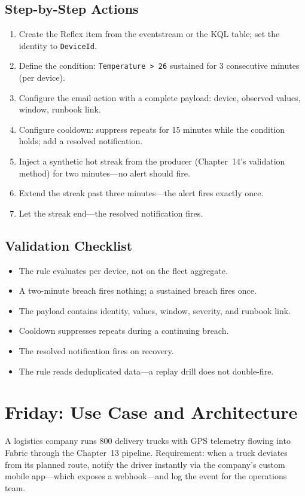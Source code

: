 \subsection{Step-by-Step Actions}
\begin{enumerate}
    \item Create the Reflex item from the eventstream or the KQL table; set the identity to \texttt{DeviceId}.
    \item Define the condition: \texttt{Temperature > 26} sustained for 3 consecutive minutes (per device).
    \item Configure the email action with a complete payload: device, observed values, window, runbook link.
    \item Configure cooldown: suppress repeats for 15 minutes while the condition holds; add a resolved notification.
    \item Inject a synthetic hot streak from the producer (Chapter~14's validation method) for two minutes---no alert should fire.
    \item Extend the streak past three minutes---the alert fires exactly once.
    \item Let the streak end---the resolved notification fires.
\end{enumerate}

\subsection{Validation Checklist}
\begin{itemize}
    \item The rule evaluates per device, not on the fleet aggregate.
    \item A two-minute breach fires nothing; a sustained breach fires once.
    \item The payload contains identity, values, window, severity, and runbook link.
    \item Cooldown suppresses repeats during a continuing breach.
    \item The resolved notification fires on recovery.
    \item The rule reads deduplicated data---a replay drill does not double-fire.
\end{itemize}

\section{Friday: Use Case and Architecture}
A logistics company runs 800 delivery trucks with GPS telemetry flowing into Fabric through the Chapter~13 pipeline. Requirement: when a truck deviates from its planned route, notify the driver instantly via the company's custom mobile app---which exposes a webhook---and log the event for the operations team.

